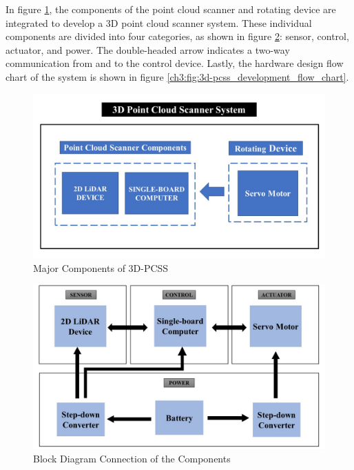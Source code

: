 In figure \ref{ch3:fig:components_of_3d-pcss}, the components of the point cloud scanner and rotating device are integrated to develop a 3D point cloud scanner system. These individual components are divided into four categories, as shown in figure \ref{ch3:fig:block-digram-connection}: sensor, control, actuator, and power. The double-headed arrow indicates a two-way communication from and to the control device. Lastly, the hardware design flow chart of the system is shown in figure \ref{ch3:fig:3d-pcss_development_flow_chart}.

\begin{figure}[H]
	\centering
	\includegraphics[width=1\textwidth]{Figures/3D-PCSS components}
	\caption{Major Components of 3D-PCSS}
	\label{ch3:fig:components_of_3d-pcss}
\end{figure}

\begin{figure}[H]
	\centering
	\includegraphics[width=1\textwidth]{Figures/components-block-diagram}
	\caption{Block Diagram Connection of the Components}
	\label{ch3:fig:block-digram-connection}
\end{figure}


